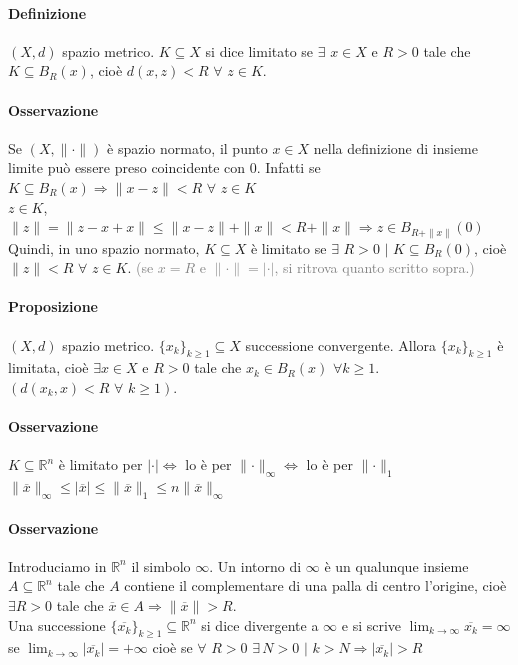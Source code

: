 \documentclass{article}
\newcommand{\R}{\mathbb{R}}
\begin{document}
\paragraph{{Definizione}}
$(X,d)$ spazio metrico. $K \subseteq X$ si dice limitato se $\exists\,\, x \in X$ e $R>0$ tale che $ K \subseteq B_R(x)$, cioè $d(x,z)< R \,\, \forall \,\,z \in K$. 

\paragraph{{Osservazione}}
Se $(X, \| \cdot \|)$ è spazio normato, il punto $x \in X$ nella definizione di insieme limite può essere preso coincidente con $0$. Infatti se $K \subseteq B_R(x) \Rightarrow \| x-z \| < R \,\, \forall \,\, z \in K$\\
$z \in K$, $\| z \| =\| z-x+x \| \leq \| x-z \| + \| x\| <R+\| x \| \Rightarrow z \in B_{R+\| x\|}(0)$\\
Quindi, in uno spazio normato, $K \subseteq X$ è limitato se $\exists \,\, R >0 \,\,|\,\, K \subseteq B_R(0)$, cioè $\| z \| < R \,\,\forall\,\, z \in K$. \textcolor{grey}{(se $x = R$ e $\| \cdot \| = |\cdot|$, si ritrova quanto scritto sopra.)}

\paragraph{{Proposizione}}
$(X,d)$ spazio metrico. $\{x_k\}_{k\geq 1} \subseteq X$ successione convergente. Allora $\{x_k\}_{k \geq 1}$ è limitata, cioè $\exists x \in X$ e $R >0$ tale che $x_k \in B_R(x)\,\, \forall k \geq 1$.
$(d(x_k,x)< R \,\, \forall \,\, k \geq 1)$.

\paragraph{{Osservazione}}
$K \subseteq \R^n$ è limitato per $|\cdot| \Leftrightarrow$ lo è per $\parallel \cdot \parallel_\infty \Leftrightarrow$ lo è per $\parallel \cdot \parallel_1$\\
$\parallel \overline{x} \parallel_\infty \leq |\overline{x}|\leq \parallel \overline{x} \parallel_1 \leq n \parallel\overline{x} \parallel_\infty$

\paragraph{{Osservazione}}
Introduciamo in $\R^n$ il simbolo $\infty$. Un intorno di $\infty$ è un qualunque insieme $A \subseteq \R^n$ tale che $A$ contiene il complementare di una palla di centro l'origine, cioè $\exists R>0$ tale che $\overline{x} \in A \Rightarrow \parallel \overline{x} \parallel > R$.\\
Una successione $\{\overline{x_k}\}_{k\geq 1} \subseteq \R^n$ si dice divergente a $\infty$ e si scrive $\lim_{k \rightarrow \infty} \overline{x_k}=\infty$ se $\lim_{k \rightarrow \infty} |\overline{x_k}|=+\infty$ cioè se $\forall\,\, R > 0\,\, \exists\, N >0\,\,|\,\,k>N \Rightarrow |\overline{x_k}|>R$
\end{document}

